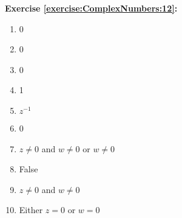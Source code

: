 \noindent\textbf{Exercise \ref{exercise:ComplexNumbers:12}:}
\begin{multicols}{3}
\begin{enumerate}
\item
0

\item
0

\item
0

\item
1

\item
$z^{-1}$

\item
0

\item
$z \neq 0$ and $w \neq 0$ or $w \neq 0$

\item
False

\item
$z \neq 0$ and $w \neq 0$

\item
Either $z=0$ or $w=0$
\end{enumerate}
\end{multicols}

